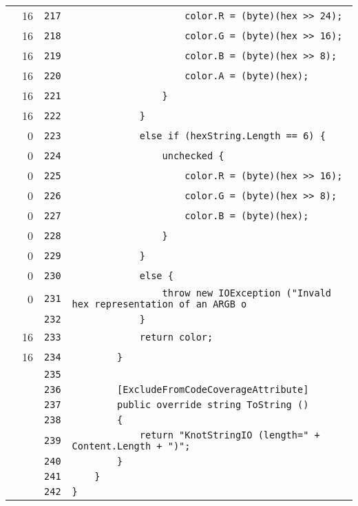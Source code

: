 \documentclass[a4paper,10pt]{article}
\begin{document}
\begin{longtable}[l]{lrrl}
\cellcolor{green} & 16 & \verb~217~ & \verb~                    color.R = (byte)(hex >> 24);~\\
\cellcolor{green} & 16 & \verb~218~ & \verb~                    color.G = (byte)(hex >> 16);~\\
\cellcolor{green} & 16 & \verb~219~ & \verb~                    color.B = (byte)(hex >> 8);~\\
\cellcolor{green} & 16 & \verb~220~ & \verb~                    color.A = (byte)(hex);~\\
\cellcolor{green} & 16 & \verb~221~ & \verb~                }~\\
\cellcolor{green} & 16 & \verb~222~ & \verb~            }~\\
\cellcolor{red} & 0 & \verb~223~ & \verb~            else if (hexString.Length == 6) {~\\
\cellcolor{red} & 0 & \verb~224~ & \verb~                unchecked {~\\
\cellcolor{red} & 0 & \verb~225~ & \verb~                    color.R = (byte)(hex >> 16);~\\
\cellcolor{red} & 0 & \verb~226~ & \verb~                    color.G = (byte)(hex >> 8);~\\
\cellcolor{red} & 0 & \verb~227~ & \verb~                    color.B = (byte)(hex);~\\
\cellcolor{red} & 0 & \verb~228~ & \verb~                }~\\
\cellcolor{red} & 0 & \verb~229~ & \verb~            }~\\
\cellcolor{red} & 0 & \verb~230~ & \verb~            else {~\\
\cellcolor{red} & 0 & \verb~231~ & \verb~                throw new IOException ("Invald hex representation of an ARGB o~\\
\cellcolor{gray} &  & \verb~232~ & \verb~            }~\\
\cellcolor{green} & 16 & \verb~233~ & \verb~            return color;~\\
\cellcolor{green} & 16 & \verb~234~ & \verb~        }~\\
\cellcolor{gray} &  & \verb~235~ & \verb~~\\
\cellcolor{gray} &  & \verb~236~ & \verb~        [ExcludeFromCodeCoverageAttribute]~\\
\cellcolor{gray} &  & \verb~237~ & \verb~        public override string ToString ()~\\
\cellcolor{gray} &  & \verb~238~ & \verb~        {~\\
\cellcolor{gray} &  & \verb~239~ & \verb~            return "KnotStringIO (length=" + Content.Length + ")";~\\
\cellcolor{gray} &  & \verb~240~ & \verb~        }~\\
\cellcolor{gray} &  & \verb~241~ & \verb~    }~\\
\cellcolor{gray} &  & \verb~242~ & \verb~}~\\
\end{longtable}
\newpage
\end{document}
